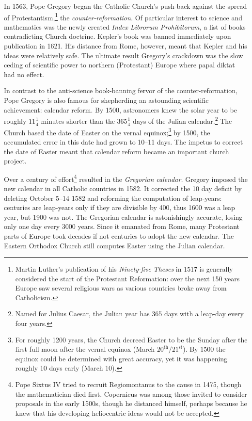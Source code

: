 In 1563, Pope Gregory began the Catholic Church's push-back against the spread of Protestantism,\footnote{Martin Luther's publication of his \emph{Ninety-five Theses} in 1517 is generally considered the start of the Protestant Reformation: over the next 150 years Europe saw several religious wars as various countries broke away from Catholicism.} the \emph{counter-reformation.} Of particular interest to science and mathematics was the newly created \emph{Index Librorum Prohibitorum,} a list of books contradicting Church doctrine. %
Kepler's book was banned immediately upon publication in 1621. His distance from Rome, however, meant that Kepler and his ideas were relatively safe. The ultimate result Gregory's crackdown was the slow ceding of scientific power to northern (Protestant) Europe where papal diktat had no effect. \smallbreak

In contrast to the anti-science book-banning fervor of the counter-reformation, Pope Gregory is also famous for shepherding an astounding scientific achievement: calendar reform. By 1500, astronomers knew the solar year to be roughly $11\frac 14$ minutes shorter than the $365\frac 14$ days of the Julian calendar.\footnote{Named for Julius Caesar, the Julian year has 365 days with a leap-day every four years. %
} The Church based the date of Easter on the vernal equinox;\footnote{%
For roughly 1200 years, the Church decreed Easter to be the Sunday after the first full moon after the vernal equinox (March $20^\text{th}/21^\text{st}$). By 1500 the equinox could be determined with great accuracy, yet it was happening roughly 10 days early (March 10\th).} by 1500, the accumulated error in this date had grown to 10--11 days. The impetus to correct the date of Easter meant that calendar reform became an important church project.\smallbreak

Over a century of effort\footnote{Pope Sixtus IV tried to recruit Regiomontanus to the cause in 1475, though the mathematician died first. Copernicus was among those invited to consider proposals in the early 1500s, though he distanced himself, perhaps because he knew that his developing heliocentric ideas would not be accepted.} resulted in the \emph{Gregorian calendar.} %
Gregory imposed the new calendar in all Catholic countries in 1582. It corrected the 10 day deficit by deleting October 5\th--14\th{} 1582 and reforming the computation of leap-years: centuries are leap-years only if they are divisible by 400, thus 1600 was a leap year, but 1900 was not. The Gregorian calendar is astonishingly accurate, losing only one day every 3000 years. Since it emanated from Rome, many Protestant parts of Europe took decades if not centuries to adopt the new calendar. The Eastern Orthodox Church still computes Easter using the Julian calendar.%


